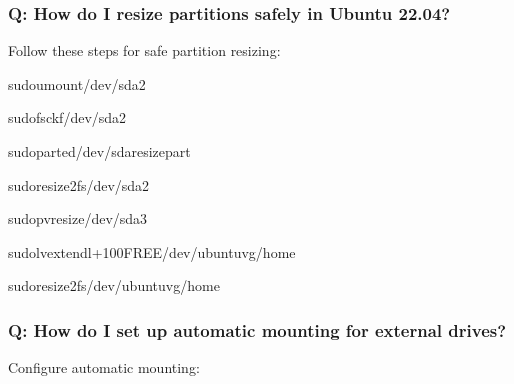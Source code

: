 \documentclass[letterpaper,10pt,english]{sphinxmanual}
\begin{document}
\subsubsection{Q: How do I resize partitions safely in Ubuntu 22.04?}
\label{\detokenize{ubuntu-setup:q-how-do-i-resize-partitions-safely-in-ubuntu-22-04}}
\sphinxAtStartPar
{} Follow these steps for safe partition resizing:

\begin{sphinxVerbatim}[commandchars=\\\{\}]

sudoumount/dev/sda2

sudofsck\PYGZhy{}f/dev/sda2

sudoparted/dev/sdaresizepart\PYGZpc{}

sudoresize2fs/dev/sda2

sudopvresize/dev/sda3

sudolvextend\PYGZhy{}l+100\PYGZpc{}FREE/dev/ubuntu\PYGZhy{}vg/home

sudoresize2fs/dev/ubuntu\PYGZhy{}vg/home
\end{sphinxVerbatim}


\subsubsection{Q: How do I set up automatic mounting for external drives?}
\label{\detokenize{ubuntu-setup:q-how-do-i-set-up-automatic-mounting-for-external-drives}}
\sphinxAtStartPar
{} Configure automatic mounting:
\end{document}
